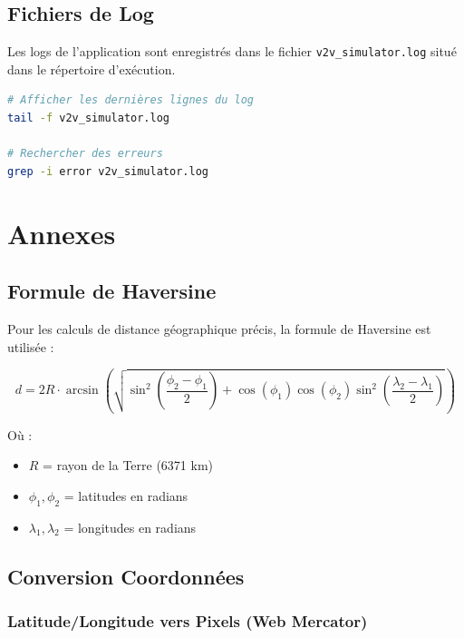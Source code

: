 \documentclass[12pt,a4paper]{article}
\begin{document}
\subsection{Fichiers de Log}

Les logs de l'application sont enregistrés dans le fichier \texttt{v2v\_simulator.log} situé dans le répertoire d'exécution.

\begin{lstlisting}[language=bash, caption={Consultation des logs}]
# Afficher les dernières lignes du log
tail -f v2v_simulator.log

# Rechercher des erreurs
grep -i error v2v_simulator.log
\end{lstlisting}

\section{Annexes}

\subsection{Formule de Haversine}

Pour les calculs de distance géographique précis, la formule de Haversine est utilisée :

\begin{equation}
d = 2R \cdot \arcsin\left(\sqrt{\sin^2\left(\frac{\phi_2-\phi_1}{2}\right) + \cos(\phi_1)\cos(\phi_2)\sin^2\left(\frac{\lambda_2-\lambda_1}{2}\right)}\right)
\end{equation}

Où :
\begin{itemize}
    \item $R$ = rayon de la Terre (6371 km)
    \item $\phi_1, \phi_2$ = latitudes en radians
    \item $\lambda_1, \lambda_2$ = longitudes en radians
\end{itemize}

\subsection{Conversion Coordonnées}

\subsubsection{Latitude/Longitude vers Pixels (Web Mercator)}
\end{document}
